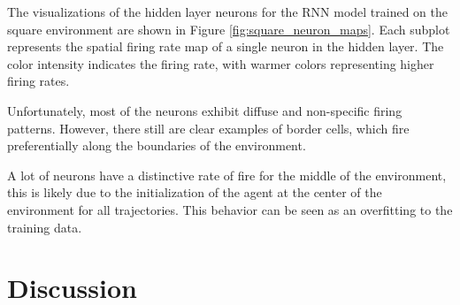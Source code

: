 \documentclass{article}
\begin{document}
The visualizations of the hidden layer neurons for the RNN model trained on the square environment are shown in Figure \ref{fig:square_neuron_maps}. Each subplot represents the spatial firing rate map of a single neuron in the hidden layer. The color intensity indicates the firing rate, with warmer colors representing higher firing rates. 

Unfortunately, most of the neurons exhibit diffuse and non-specific firing patterns. However, there still are clear examples of border cells, which fire preferentially along the boundaries of the environment. 

A lot of neurons have a distinctive rate of fire for the middle of the environment, this is likely due to the initialization of the agent at the center of the environment for all trajectories. This behavior can be seen as an overfitting to the training data. 



\section{Discussion}






\end{document}
